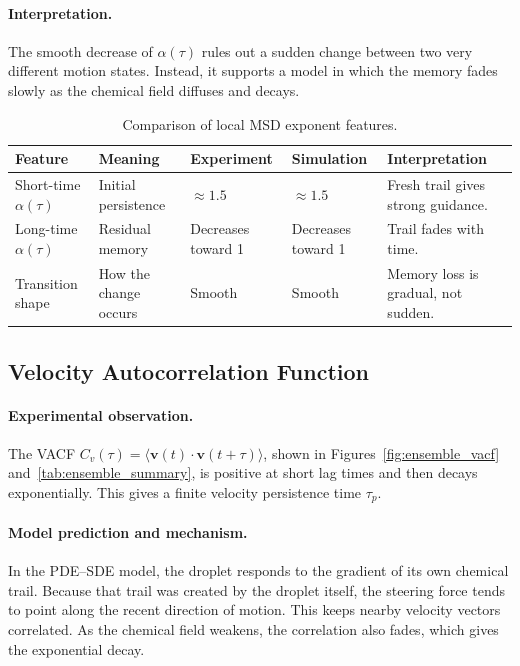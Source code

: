 \paragraph{Interpretation.}
The smooth decrease of $\alpha(\tau)$ rules out a sudden change between two very different motion states. Instead, it supports a model in which the memory fades slowly as the chemical field diffuses and decays.

\begin{table}[htbp]
\centering
\caption{Comparison of local MSD exponent features.}
\label{tab:local_msd_comparison}
\renewcommand{\arraystretch}{1.25}
\begin{tabular}{p{2.4cm} p{3.0cm} p{2.3cm} p{2.3cm} p{3.2cm}}
\hline\hline
\textbf{Feature} & \textbf{Meaning} & \textbf{Experiment} & \textbf{Simulation} & \textbf{Interpretation} \\
\hline
Short-time $\alpha(\tau)$ & Initial persistence & $\approx 1.5$ & $\approx 1.5$ & Fresh trail gives strong guidance. \\[4pt]
Long-time $\alpha(\tau)$ & Residual memory & Decreases toward 1 & Decreases toward 1 & Trail fades with time. \\[4pt]
Transition shape & How the change occurs & Smooth & Smooth & Memory loss is gradual, not sudden. \\
\hline\hline
\end{tabular}
\end{table}

\subsection{Velocity Autocorrelation Function}
\label{subsec:comp_vacf}

\paragraph{Experimental observation.}
The VACF $C_v(\tau)=\langle \mathbf{v}(t)\cdot\mathbf{v}(t+\tau)\rangle$, shown in Figures~\ref{fig:ensemble_vacf} and~\ref{tab:ensemble_summary}, is positive at short lag times and then decays exponentially. This gives a finite velocity persistence time $\tau_p$.

\paragraph{Model prediction and mechanism.}
In the PDE--SDE model, the droplet responds to the gradient of its own chemical trail. Because that trail was created by the droplet itself, the steering force tends to point along the recent direction of motion. This keeps nearby velocity vectors correlated. As the chemical field weakens, the correlation also fades, which gives the exponential decay.

